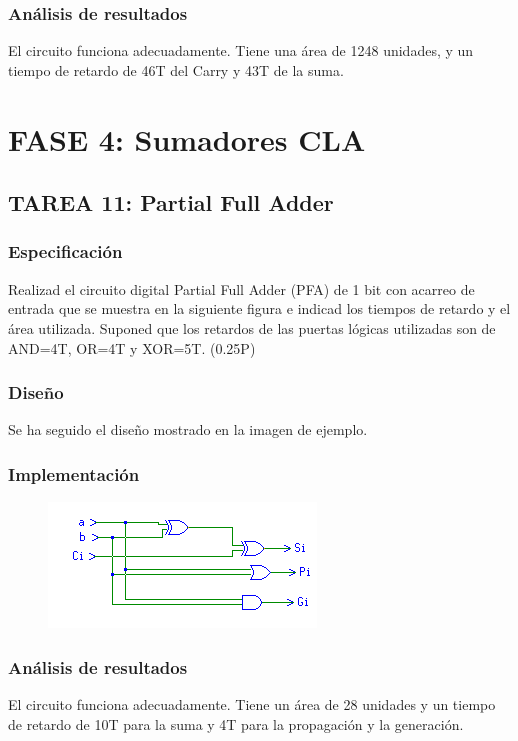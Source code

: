 \documentclass{article}
\begin{document}
		\subsubsection*{Análisis de resultados}
		El circuito funciona adecuadamente. Tiene una área de 1248 unidades, y un tiempo de retardo de 46T del Carry y 43T de la suma.

\section{FASE 4: Sumadores CLA}
	\subsection{TAREA 11: Partial Full Adder}
		\subsubsection*{Especificación}
		Realizad el circuito digital Partial Full Adder (PFA) de 1 bit con acarreo de entrada
		que se muestra en la siguiente figura e indicad los tiempos de retardo y el área utilizada. Suponed
		que los retardos de las puertas lógicas utilizadas son de AND=4T, OR=4T y XOR=5T. (0.25P)


		\subsubsection*{Diseño}
		Se ha seguido el diseño mostrado en la imagen de ejemplo.

		\subsubsection*{Implementación}
		 \begin{figure}[ht]
			\includegraphics[width=0.8\linewidth]{PFA}
		 	\centering
		 \end{figure}


		\subsubsection*{Análisis de resultados}
		El circuito funciona adecuadamente. Tiene un área de 28 unidades y un tiempo de retardo de 10T para la suma y 4T para la propagación y la generación.
\end{document}
